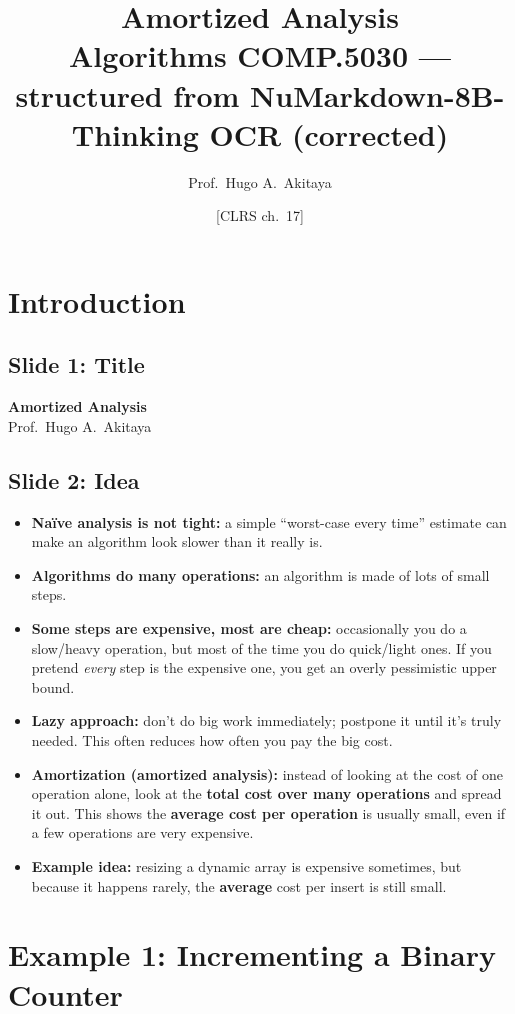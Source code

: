 \documentclass[11pt]{article}
\title{Amortized Analysis\\[1ex]\large Algorithms COMP.5030 --- structured from NuMarkdown-8B-Thinking OCR (corrected)}
\author{Prof.\ Hugo A.\ Akitaya}
\date{[CLRS ch.\ 17]}
\newcommand{\slide}[2]{\subsection*{Slide #1: #2}}
\begin{document}
\maketitle

\section{Introduction}

\slide{1}{Title}
\begin{center}
\textbf{\Large Amortized Analysis}\\[1ex]
Prof.\ Hugo A.\ Akitaya \quad [CLRS ch.\ 17]
\end{center}

\slide{2}{Idea}
\begin{itemize}
  \item \textbf{Na\"ive analysis is not tight:} a simple ``worst-case every time'' estimate can make an algorithm look slower than it really is.
  \item \textbf{Algorithms do many operations:} an algorithm is made of lots of small steps.
  \item \textbf{Some steps are expensive, most are cheap:} occasionally you do a slow/heavy operation, but most of the time you do quick/light ones. If you pretend \emph{every} step is the expensive one, you get an overly pessimistic upper bound.
  \item \textbf{Lazy approach:} don't do big work immediately; postpone it until it's truly needed. This often reduces how often you pay the big cost.
  \item \textbf{Amortization (amortized analysis):} instead of looking at the cost of one operation alone, look at the \textbf{total cost over many operations} and spread it out. This shows the \textbf{average cost per operation} is usually small, even if a few operations are very expensive.
  \item \textbf{Example idea:} resizing a dynamic array is expensive sometimes, but because it happens rarely, the \textbf{average} cost per insert is still small.
\end{itemize}

\section{Example 1: Incrementing a Binary Counter}
\end{document}
